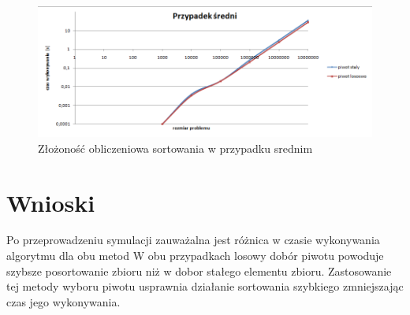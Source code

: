 \documentclass[10pt,oneside]{mwbk}
\begin{document}
	\begin{figure}[!h]
	\centering
	\includegraphics[scale=0.7]{rys/przypadek_sredni.png}
	\caption{ Złożoność obliczeniowa sortowania w przypadku srednim}
	\end{figure}
\newpage
\section {Wnioski}
\indent Po przeprowadzeniu symulacji zauważalna jest różnica w czasie wykonywania algorytmu dla obu metod
W obu przypadkach losowy dobór piwotu powoduje szybsze posortowanie zbioru niż w dobor stałego elementu zbioru.
\indent Zastosowanie tej metody wyboru piwotu usprawnia działanie sortowania szybkiego zmniejszając czas jego wykonywania. 
\end{document}
